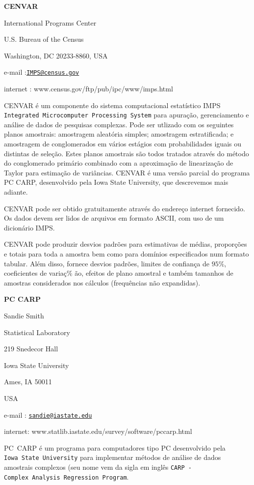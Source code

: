 \documentclass[]{book}
\theoremstyle{definition}
\theoremstyle{definition}
\theoremstyle{definition}
\theoremstyle{remark}
\begin{document}
\textbf{CENVAR}

International Programs Center

U.S. Bureau of the Census

Washington, DC 20233-8860, USA

e-mail :\href{mailto:IMPS@census.gov}{\nolinkurl{IMPS@census.gov}}

internet : www.census.gov/ftp/pub/ipc/www/imps.html

CENVAR é um componente do sistema computacional estatístico IMPS
\texttt{Integrated\ Microcomputer\ Processing\ System} para apuração,
gerenciamento e análise de dados de pesquisas complexas. Pode ser
utlizado com os seguintes planos amostrais: amostragem aleatória
simples; amostragem estratificada; e amostragem de conglomerados em
vários estágios com probabilidades iguais ou distintas de seleção. Estes
planos amostrais são todos tratados através do método do conglomerado
primário combinado com a aproximação de linearização de Taylor para
estimação de variâncias. CENVAR é uma versão parcial do programa PC
CARP, desenvolvido pela Iowa State University, que descrevemos mais
adiante.

CENVAR pode ser obtido gratuitamente através do endereço internet
fornecido. Os dados devem ser lidos de arquivos em formato ASCII, com
uso de um dicionário IMPS.

CENVAR pode produzir desvios padrões para estimativas de médias,
proporções e totais para toda a amostra bem como para domínios
especificados num formato tabular. Além disso, fornece desvios padrões,
limites de confiança de \(95\%\), coeficientes de variaç\% ão, efeitos
de plano amostral e também tamanhos de amostras considerados nos
cálculos (frequências não expandidas).

\textbf{PC CARP}

Sandie Smith

Statistical Laboratory

219 Snedecor Hall

Iowa State University

Ames, IA 50011

USA

e-mail :
\href{mailto:sandie@iastate.edu}{\nolinkurl{sandie@iastate.edu}}

internet: www.statlib.iastate.edu/survey/software/pccarp.html

PC~CARP é um programa para computadores tipo PC desenvolvido pela
\texttt{Iowa\ State\ University} para implementar métodos de análise de
dados amostrais complexos (seu nome vem da sigla em inglês
\texttt{CARP\ -Complex\ Analysis\ Regression\ Program}.
\end{document}
